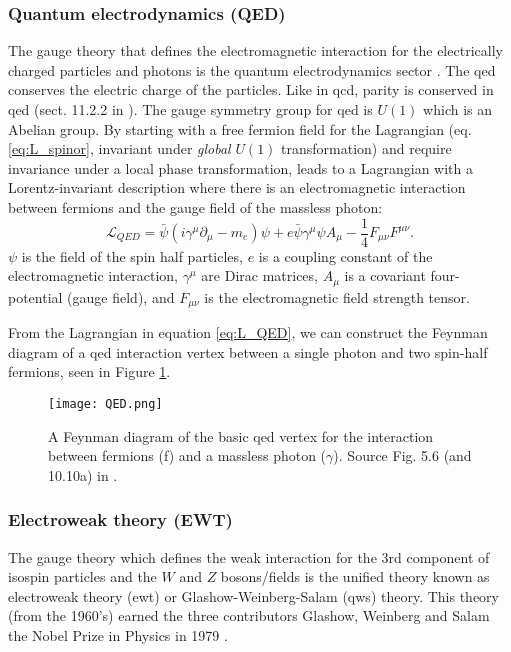 \documentclass[a4paper, american, 12pt]{report}
\begin{document}
	
	\subsubsection{Quantum electrodynamics (QED)}
	\label{subsubsect:Theory-QED}
	The gauge theory that defines the electromagnetic interaction for the electrically charged particles and photons is the quantum electrodynamics sector \cite{QED}. The \acrshort{qed} conserves the electric charge of the particles. Like in \acrshort{qcd}, parity is conserved in \acrshort{qed} (sect. 11.2.2 in \citet{thomson2013modern}). The gauge symmetry group for \acrshort{qed} is $U(1)$ which is an Abelian group. By starting with a free fermion field for the Lagrangian (eq.\ref{eq:L_spinor}, invariant under \textit{global} $U(1)$ transformation) and require invariance under a local phase transformation, leads to a Lagrangian with a Lorentz-invariant description where there is an electromagnetic interaction between fermions and the gauge field of the massless photon:
	\begin{equation}
	\label{eq:L_QED}
		\mathcal{L}_{QED}=\bar{\psi}(i\gamma^{\mu}\partial_{\mu}-m_e)\psi +e\bar{\psi}\gamma^{\mu}\psi A_{\mu} -\frac{1}{4}F_{\mu\nu}F^{\mu\nu}.
	\end{equation}
	$\psi$ is the field of the spin half particles, $e$ is a coupling constant of the electromagnetic interaction, $\gamma^{\mu}$ are Dirac matrices, $A_{\mu}$ is a covariant four-potential (gauge field), and $F_{\mu\nu}$ is the electromagnetic field strength tensor.
	
	From the Lagrangian in equation \ref{eq:L_QED}, we can construct the Feynman diagram of a \acrshort{qed} interaction vertex between a single photon and two spin-half fermions, seen in Figure \ref{fig:QED}.
	\begin{figure}[htbp!]
		\centering\texttt{[image: QED.png]}
		\caption[\acrshort{qed} vertex Feynman diagram.]{A Feynman diagram of the basic \acrshort{qed} vertex for the interaction between fermions (f) and a massless photon ($\gamma$). Source Fig. 5.6 (and 10.10a) in \citet{thomson2013modern}. \label{fig:QED}}
	\end{figure}
	
	
	\subsubsection{Electroweak theory (EWT)}
	\label{subsubsect:Theory-EWT}
	The gauge theory which defines the weak interaction for the 3rd component of isospin particles and the $W$ and $Z$ bosons/fields is the unified theory known as electroweak theory (\acrshort{ewt}) \cite{EWT} or Glashow-Weinberg-Salam (\acrshort{qws}) theory. This theory (from the 1960's) earned the three contributors Glashow\cite{glashow1961partial}, Weinberg\cite{weinberg1967model} and Salam\cite{salam1968n} the Nobel Prize in Physics in 1979 \cite{NobelPrizeEWT}\cite{salam1979nobel}.
	
\end{document}
